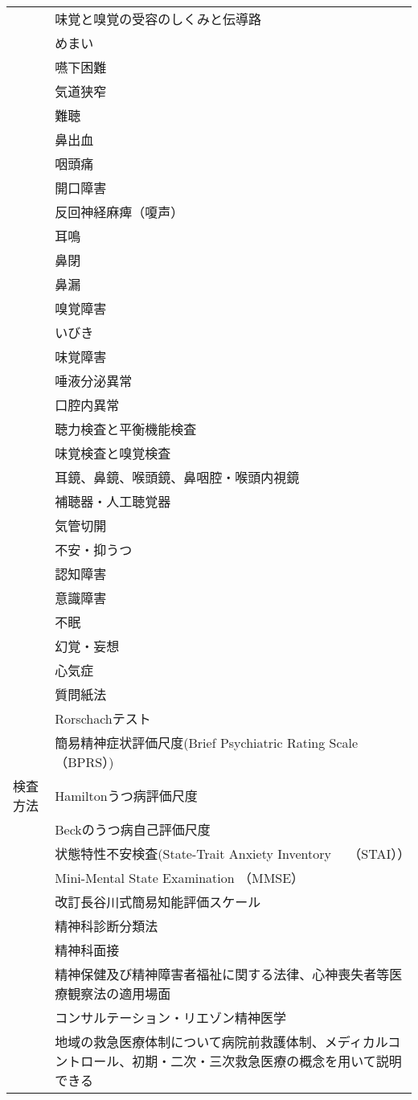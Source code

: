 \begin{xltabular}{\linewidth}{XX}
 & 味覚と嗅覚の受容のしくみと伝導路 \\
 & めまい \\
 & 嚥下困難 \\
 & 気道狭窄 \\
 & 難聴 \\
 & 鼻出血 \\
 & 咽頭痛 \\
 & 開口障害 \\
 & 反回神経麻痺（嗄声） \\
 & 耳鳴 \\
 & 鼻閉 \\
 & 鼻漏 \\
 & 嗅覚障害 \\
 & いびき \\
 & 味覚障害 \\
 & 唾液分泌異常 \\
 & 口腔内異常 \\
 & 聴力検査と平衡機能検査 \\
 & 味覚検査と嗅覚検査 \\
 & 耳鏡、鼻鏡、喉頭鏡、鼻咽腔・喉頭内視鏡 \\
 & 補聴器・人工聴覚器 \\
 & 気管切開 \\
 & 不安・抑うつ \\
 & 認知障害 \\
 & 意識障害 \\
 & 不眠 \\
 & 幻覚・妄想 \\
 & 心気症 \\
 & 質問紙法 \\
 & Rorschachテスト \\
 & 簡易精神症状評価尺度(Brief Psychiatric Rating Scale （BPRS）) \\
検査方法 & Hamiltonうつ病評価尺度 \\
 & Beckのうつ病自己評価尺度 \\
 & 状態特性不安検査(State-Trait Anxiety Inventory　 （STAI）） \\
 & Mini-Mental State Examination （MMSE） \\
 & 改訂長谷川式簡易知能評価スケール \\
 & 精神科診断分類法 \\
 & 精神科面接 \\
 & 精神保健及び精神障害者福祉に関する法律、心神喪失者等医療観察法の適用場面 \\
 & コンサルテーション・リエゾン精神医学 \\
 & 地域の救急医療体制について病院前救護体制、メディカルコントロール、初期・二次・三次救急医療の概念を用いて説明できる \\

\end{xltabular}
